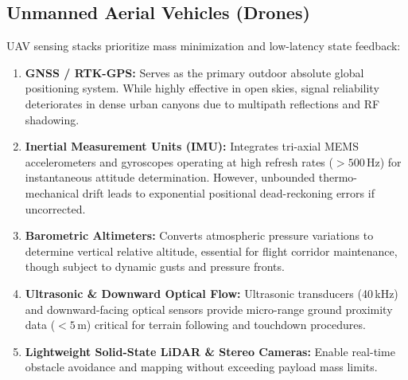 \documentclass[conference,10pt]{IEEEtran}
\begin{document}
\subsection{Unmanned Aerial Vehicles (Drones)}
UAV sensing stacks prioritize mass minimization and low-latency state feedback:
\begin{enumerate}
    \item \textbf{GNSS / RTK-GPS:} Serves as the primary outdoor absolute global positioning system. While highly effective in open skies, signal reliability deteriorates in dense urban canyons due to multipath reflections and RF shadowing.
    \item \textbf{Inertial Measurement Units (IMU):} Integrates tri-axial MEMS accelerometers and gyroscopes operating at high refresh rates ($>500$\,Hz) for instantaneous attitude determination. However, unbounded thermo-mechanical drift leads to exponential positional dead-reckoning errors if uncorrected.
    \item \textbf{Barometric Altimeters:} Converts atmospheric pressure variations to determine vertical relative altitude, essential for flight corridor maintenance, though subject to dynamic gusts and pressure fronts.
    \item \textbf{Ultrasonic \& Downward Optical Flow:} Ultrasonic transducers (40\,kHz) and downward-facing optical sensors provide micro-range ground proximity data ($<5$\,m) critical for terrain following and touchdown procedures.
    \item \textbf{Lightweight Solid-State LiDAR \& Stereo Cameras:} Enable real-time obstacle avoidance and mapping without exceeding payload mass limits.
\end{enumerate}
\end{document}
